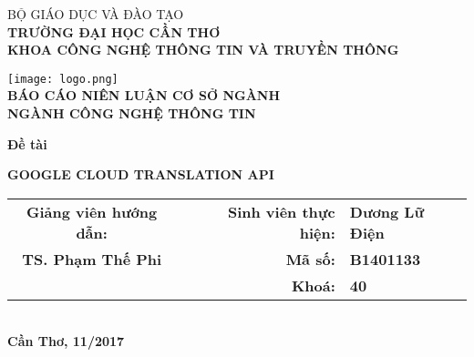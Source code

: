 \documentclass[../thesis.tex]{subfiles}
\begin{document}
\begin{titlepage}

\begin{center}

BỘ GIÁO DỤC VÀ ĐÀO TẠO\\
\textbf{TRƯỜNG ĐẠI HỌC CẦN THƠ\\}
\textbf{KHOA CÔNG NGHỆ THÔNG TIN VÀ TRUYỀN THÔNG\\[1cm]}

\texttt{[image: logo.png]}\\[1cm]

\textbf{BÁO CÁO NIÊN LUẬN CƠ SỞ NGÀNH\\}
\textbf{NGÀNH CÔNG NGHỆ THÔNG TIN\\[2cm]}

\begin{large}
\textbf{Đề tài\\[0.5cm]}
\end{large}
\textbf{{\LARGE GOOGLE CLOUD TRANSLATION API}}
\\[4cm]

\begin{tabular}{ c c r l }
 \textbf{Giảng viên hướng dẫn:} & & \textbf{Sinh viên thực hiện:} & \textbf{Dương Lữ Điện}\\ 
 \textbf{TS. Phạm Thế Phi} & & \textbf{Mã số:} & \textbf{B1401133}\\  
 & & \textbf{Khoá:} & \textbf{40}    
\end{tabular}
\\[4cm]

\textbf{Cần Thơ, 11/2017}

\end{center}

\end{titlepage}
\end{document}
